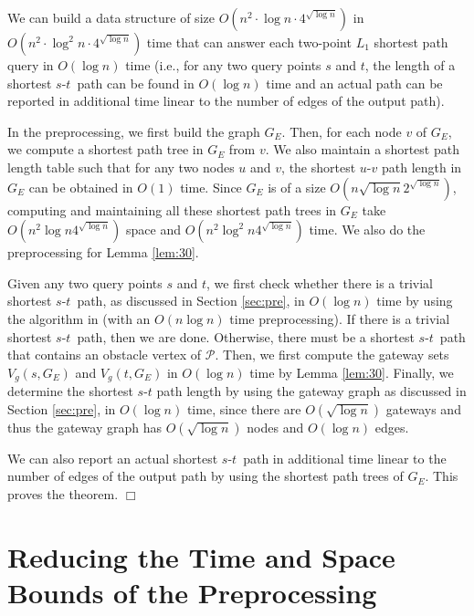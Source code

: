 \documentclass[english,runningheads,11pt]{llncs}
\def\calP{\mathcal{P}}
\def\st{$s$-$t$}
\newenvironment{proof}{\noindent {\textbf{Proof:}}\rm}{\hfill $\Box$\rm}
\begin{document}
\begin{theorem}\label{theo:10}
We can build a data structure of size $O(n^2\cdot \log n \cdot
4^{\sqrt{\log n}})$ in $O(n^2\cdot \log^2 n \cdot
4^{\sqrt{\log n}})$ time that can
answer each two-point $L_1$ shortest path query in $O(\log n)$ time (i.e., for
any two query points $s$ and $t$, the length of a shortest \st\ path can be found in $O(\log n)$
time and an actual path can be reported in additional time linear to the number of edges of the output path).
\end{theorem}
\begin{proof}
In the preprocessing, we first build the graph $G_E$. Then, for each node $v$ of $G_E$, we compute a shortest path tree in $G_E$ from $v$. We also maintain a shortest path length table such that
for any two nodes $u$ and $v$, the shortest $u$-$v$ path length in $G_E$ can be obtained in $O(1)$ time. Since $G_E$ is of a size $O(n\sqrt{\log n}2^{\sqrt{\log n}})$, computing and
maintaining all these shortest
path trees in $G_E$ take $O(n^2\log n 4^{\sqrt{\log n}})$ space and
$O(n^2 \log^2 n
4^{\sqrt{\log n}})$ time.
We also do the preprocessing for Lemma \ref{lem:30}.

Given any two query points $s$ and $t$, we first check whether there
is a trivial shortest \st\ path, as discussed in Section
\ref{sec:pre}, in $O(\log n)$ time by using the algorithm
in \cite{ref:ChenSh00} (with an $O(n\log n)$ time preprocessing). If
there is a trivial shortest \st\ path, then we are done.
Otherwise, there must be a shortest \st\ path that contains an
obstacle vertex of $\calP$. Then, we first compute the gateway sets
$V_g(s,G_E)$ and $V_g(t,G_E)$ in $O(\log n)$ time by Lemma
\ref{lem:30}. Finally, we determine the shortest $s$-$t$ path length
by using the gateway graph as discussed in Section \ref{sec:pre}, in
$O(\log n)$ time, since there are $O(\sqrt{\log n})$ gateways and thus
the gateway graph has $O(\sqrt{\log n})$ nodes and $O(\log n)$ edges.

We can also report an actual shortest \st\ path in additional time linear to the number of edges of the output path by using the shortest path trees of $G_E$.
This proves the theorem.
\end{proof}



\section{Reducing the Time and Space Bounds of the Preprocessing}
\label{sec:obstacle}
\end{document}
